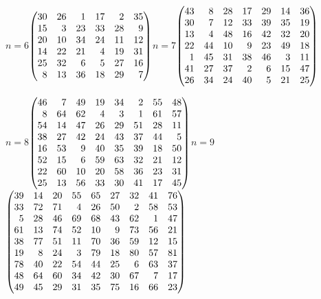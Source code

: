 \documentclass[11pt,a4paper]{article}
\theoremstyle{plain}
\theoremstyle{definition}
\theoremstyle{remark}
\begin{document}
\medskip
{\scriptsize\setlength{\arraycolsep}{1.25pt}\renewcommand{\arraystretch}{0.95}
\noindent\hfill $n=6$\quad$\left(\begin{array}{@{}rrrrrr@{}}30&26&1&17&2&35\\15&3&23&33&28&9\\20&10&34&24&11&12\\14&22&21&4&19&31\\25&32&6&5&27&16\\8&13&36&18&29&7\end{array}\right)$\hfill $n=7$\quad$\left(\begin{array}{@{}rrrrrrr@{}}43&8&28&17&29&14&36\\30&7&12&33&39&35&19\\13&4&48&16&42&32&20\\22&44&10&9&23&49&18\\1&45&31&38&46&3&11\\41&27&37&2&6&15&47\\26&34&24&40&5&21&25\end{array}\right)$\hfill\null\par\medskip
\noindent\hfill $n=8$\quad$\left(\begin{array}{@{}rrrrrrrr@{}}46&7&49&19&34&2&55&48\\8&64&62&4&3&1&61&57\\54&14&47&26&29&51&28&11\\38&27&42&24&43&37&44&5\\16&53&9&40&35&39&18&50\\52&15&6&59&63&32&21&12\\22&60&10&20&58&36&23&31\\25&13&56&33&30&41&17&45\end{array}\right)$\hfill $n=9$\quad$\left(\begin{array}{@{}rrrrrrrrr@{}}39&14&20&55&65&27&32&41&76\\33&72&71&4&26&50&2&58&53\\5&28&46&69&68&43&62&1&47\\61&13&74&52&10&9&73&56&21\\38&77&51&11&70&36&59&12&15\\19&8&24&3&79&18&80&57&81\\78&40&22&54&44&25&6&63&37\\48&64&60&34&42&30&67&7&17\\49&45&29&31&35&75&16&66&23\end{array}\right)$\hfill\null\par\medskip
}
\end{document}
